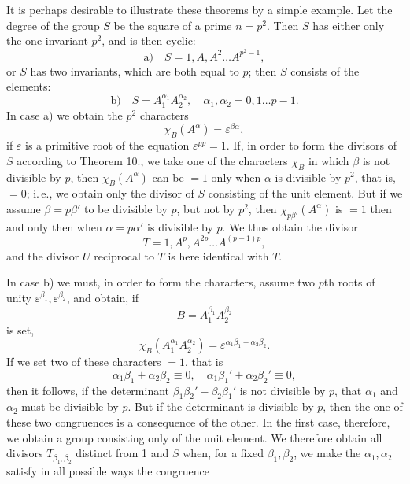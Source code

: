 
It is perhaps desirable to illustrate these theorems by a simple
example. Let the degree of the group $S$ be the square of a
prime $n = p^2$. Then $S$ has either only the one
invariant $p^2$, and is then cyclic:
\[
\text{a)}\quad S = 1, A, A^2 \dots A^{p^2-1},
\]
or $S$ has two invariants, which are both equal to $p$; then
$S$ consists of the elements:
\[
\text{b)}\quad S = A_1^{\alpha_1}A_2^{\alpha_2}, \quad \alpha_1,
\alpha_2 = 0, 1 \dots p-1.
\]
In case a) we obtain the $p^2$ characters
\[
\chi_B(A^\alpha) = \varepsilon^{\beta\alpha},
\]
if $\varepsilon$ is a primitive root of the equation
$\varepsilon^{pp} = 1$.
If, in order to form the divisors of $S$ according to Theorem 10.,
we take one of the characters $\chi_B$ in which
$\beta$ is not divisible by $p$, then $\chi_B(A^\alpha)$
can be $= 1$ only when $\alpha$ is divisible by $p^2$,
that is, $= 0$; i.\,e., we obtain only the divisor of $S$ consisting
of the unit element. But if we assume
$\beta = p\beta'$ to be divisible by $p$, but not by $p^2$, then
$\chi_{p\beta'}(A^\alpha)$ is $= 1$ then and only then when
$\alpha = p\alpha'$ is divisible by $p$. We thus obtain the
divisor
\[
T = 1, A^p, A^{2p} \dots A^{(p-1)p},
\]
and the divisor $U$ reciprocal to $T$ is here identical with $T$.

In case b) we must, in order to form the characters, assume two
$p$th roots of unity $\varepsilon^{\beta_1},
\varepsilon^{\beta_2}$, and obtain, if
\[
B = A_1^{\beta_1}A_2^{\beta_2}
\]
is set,
\[
\chi_B(A_1^{\alpha_1}A_2^{\alpha_2}) = \varepsilon^{\alpha_1\beta_1 + \alpha_2\beta_2}.
\]
If we set two of these characters $= 1$, that is
\[
\alpha_1\beta_1 + \alpha_2\beta_2 \equiv 0, \quad
\alpha_1\beta_1' + \alpha_2\beta_2' \equiv 0,
\]
then it follows, if the determinant $\beta_1\beta_2' - \beta_2\beta_1'$
is not divisible by $p$, that $\alpha_1$ and $\alpha_2$ must be
divisible by $p$. But if the determinant is divisible by $p$,
then the one of these two congruences is a consequence of the
other. In the first case, therefore, we obtain a group consisting
only of the unit element. We therefore obtain all divisors
$T_{\beta_1,\beta_2}$ distinct from 1 and $S$ when, for a fixed
$\beta_1, \beta_2$, we make the $\alpha_1, \alpha_2$ satisfy in all
possible ways the congruence
